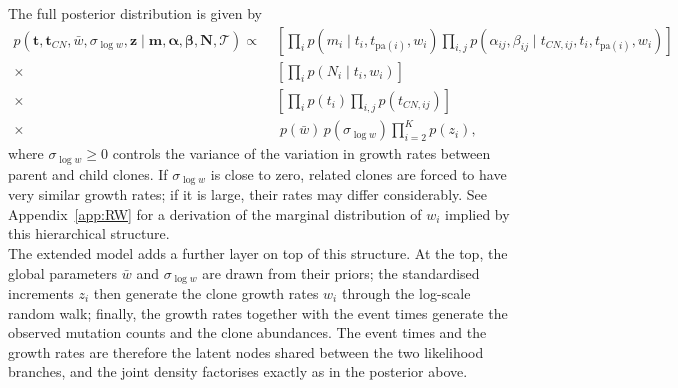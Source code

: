 The full posterior distribution is given by
%
\begin{equation}
\begin{aligned}
    p\!\left(\boldsymbol{t}, \boldsymbol{t}_{CN}, \bar{w}, \sigma_{\log w},
    \boldsymbol{z} \mid \boldsymbol{m}, \boldsymbol{\alpha}, \boldsymbol{\beta},
    \boldsymbol{N}, \mathcal{T}\right) \propto\;
    &\left[\prod_i p(m_i \mid t_i, t_{\mathrm{pa}(i)}, w_i)
    \prod_{i,j} p(\alpha_{ij}, \beta_{ij} \mid t_{CN,ij}, t_i,
    t_{\mathrm{pa}(i)}, w_i)\right] \\
    \times\; &\left[\prod_i p(N_i \mid t_i, w_i)\right] \\
    \times\; &\left[\prod_i p(t_i) \prod_{i,j} p(t_{CN,ij})\right] \\
    \times\; &\; p(\bar{w})\, p(\sigma_{\log w}) \prod_{i=2}^{K} p(z_i),
\end{aligned}
\end{equation}
%
where $\sigma_{\log w} \geq 0$ controls the variance of the variation in growth 
rates between parent and child clones. If $\sigma_{\log w}$ is close to zero, 
related clones are forced to have very similar growth rates; if it is large, their 
rates may differ considerably.
See Appendix~\ref{app:RW}  for a derivation of the marginal distribution 
of $w_i$ implied by this hierarchical structure.\\
The extended model adds a further layer on top of this structure. At the top, the global parameters $\bar{w}$ and $\sigma_{\log w}$ are drawn from their priors; the standardised increments $z_i$ then generate the clone growth rates $w_i$ through the log-scale random walk; finally, the growth rates together with the event times generate the observed mutation counts and the clone abundances. The event times and the growth rates are therefore the latent nodes shared between the two likelihood branches, and the joint density factorises exactly as in the posterior above.

\clearpage
